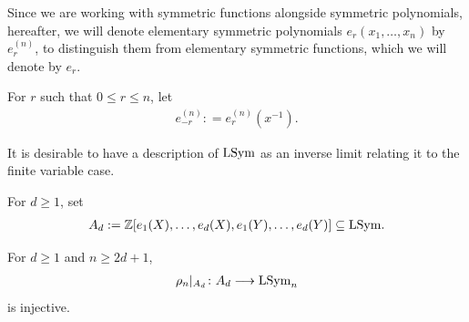 \documentclass[11pt]{amsart}
\begin{document}
Since we are working with symmetric functions alongside symmetric polynomials, hereafter, we will denote elementary symmetric polynomials $e_r(x_1, \dots, x_n)$ by \emph{$e_r^{(n)}$}, to distinguish them from elementary symmetric functions, which we will denote by \emph{$e_r$}. 

\begin{defin}
For $r$ such that $0 \leq r \leq n$, let
\begin{align}
         e_{-r}^{(n)} : = e_r^{(n)} (x^{-1}). \label{eq:x-absent}
\end{align}
\end{defin}

It is desirable to have a description of \(\mathrm{LSym}\) as an inverse limit relating it to the finite variable case.

\begin{defin}
     For $d\geq 1$, set 
\begin{align*}
    {A_d }:= \mathbb{Z}[e_1(X) , \dots, e_d(X), e_1 (Y) , \dots, e_d(Y)] \subseteq \mathrm{LSym}.
\end{align*}
\end{defin}

\begin{prop}
    For $d \geq 1$ and $n \geq 2d +1$, 
    \begin{align*}
        \rho_n|_{A_d}\colon A_d\longrightarrow \mathrm{LSym}_n
    \end{align*}
    is injective.
\end{prop}
\end{document}
